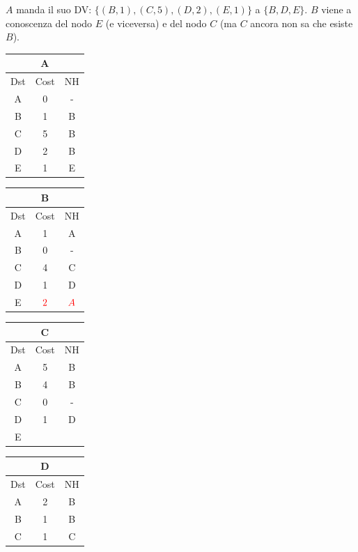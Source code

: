\documentclass[10pt]{article}
\begin{document}
			\newline \newline
			$A$ manda il suo DV: $\{(B,1),(C,5),(D,2),(E,1)\}$ a $\{B,D,E\}$.
			\newline
			$B$ viene a conoscenza del nodo $E$ (e viceversa) e del nodo $C$ (ma $C$ ancora non sa che esiste $B$).
			\begin{table}[h!]
				\begin{tabular}{|c||c||c|}
					\hline
					\multicolumn{3}{|c|}{A} \\
					\hline
					Dst & Cost & NH \\
					\hline
					A & 0 & - \\
					B & 1 & B \\
					C & 5 & B \\
					D & 2 & B \\
					E & 1 & E \\
					\hline
				\end{tabular}
				\begin{tabular}{|c||c||c|}
					\hline
					\multicolumn{3}{|c|}{B} \\
					\hline
					Dst & Cost & NH \\
					\hline
					A & 1 & A \\
					B & 0 & - \\
					C & 4 & C \\
					D & 1 & D \\
					E & $\color{red} 2$ & $\color{red} A$ \\
					\hline
				\end{tabular}
				\begin{tabular}{|c||c||c|}
					\hline
					\multicolumn{3}{|c|}{C} \\
					\hline
					Dst & Cost & NH \\
					\hline
					A & 5 & B \\
					B & 4 & B \\
					C & 0 & - \\
					D & 1 & D \\
					E &   &   \\
					\hline
				\end{tabular}
				\begin{tabular}{|c||c||c|}
					\hline
					\multicolumn{3}{|c|}{D} \\
					\hline
					Dst & Cost & NH \\
					\hline
					A & 2 & B \\
					B & 1 & B \\
					C & 1 & C \\

\end{tabular}
\end{table}
\end{document}
